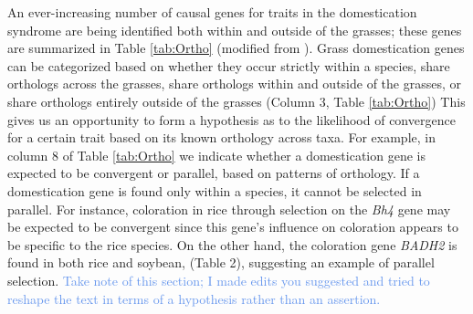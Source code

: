 \documentclass[12pt]{article}
\newcommand{\mbh}[1]{\textcolor{red}{\normalsize  #1}}
\newcommand{\mw}[1]{\textcolor{cornflowerblue}{\normalsize #1}}
\begin{document}
An ever-increasing number of causal genes for traits in the domestication syndrome are being identified both within and outside of the grasses; these genes are summarized in Table \ref{tab:Ortho} (modified from \citep{Lenser2013}).
Grass domestication genes can be categorized based on whether they occur strictly within a species, share orthologs across the grasses, share orthologs within and outside of the grasses, or share orthologs entirely outside of the grasses (Column 3, Table \ref{tab:Ortho})
This gives us an opportunity to form a hypothesis as to the likelihood of convergence for a certain trait based on its known orthology across taxa. 
For example, in column 8 of Table \ref{tab:Ortho} we indicate whether a domestication gene is expected to be convergent or parallel, based on patterns of orthology.
If a domestication gene is found only within a species, it cannot be selected in parallel.
For instance, coloration in rice through selection on the \textit{Bh4} gene may be expected to be convergent since this gene's influence on coloration appears to be specific to the rice species.
On the other hand, the coloration gene \textit{BADH2} is found in both rice and soybean, (Table 2), suggesting an example of parallel selection. \mw{Take note of this section; I made edits you suggested and tried to reshape the text in terms of a hypothesis rather than an assertion.}
\end{document}
